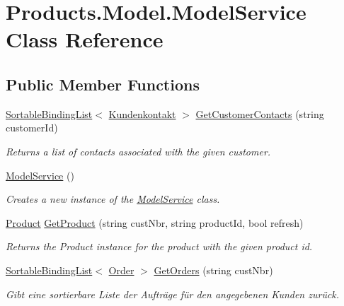 \hypertarget{class_products_1_1_model_1_1_model_service}{}\section{Products.\+Model.\+Model\+Service Class Reference}
\label{class_products_1_1_model_1_1_model_service}
\subsection*{Public Member Functions}
\begin{DoxyCompactItemize}
\item 
\hyperlink{class_products_1_1_common_1_1_sortable_binding_list}{Sortable\+Binding\+List}$<$ \hyperlink{class_products_1_1_model_1_1_entities_1_1_kundenkontakt}{Kundenkontakt} $>$ \hyperlink{class_products_1_1_model_1_1_model_service_af281c8ff9449031f251191502d0047f8}{Get\+Customer\+Contacts} (string customer\+Id)
\begin{DoxyCompactList}\small\item\em Returns a list of contacts associated with the given customer. \end{DoxyCompactList}\item 
\hyperlink{class_products_1_1_model_1_1_model_service_ad9cf5692491c9129e3bb003973f28fd1}{Model\+Service} ()
\begin{DoxyCompactList}\small\item\em Creates a new instance of the \hyperlink{class_products_1_1_model_1_1_model_service}{Model\+Service} class. \end{DoxyCompactList}\item 
\hyperlink{class_products_1_1_model_1_1_entities_1_1_product}{Product} \hyperlink{class_products_1_1_model_1_1_model_service_a5d2528c4e3669b6c49cb3e7c16307f49}{Get\+Product} (string cust\+Nbr, string product\+Id, bool refresh)
\begin{DoxyCompactList}\small\item\em Returns the Product instance for the product with the given product id. \end{DoxyCompactList}\item 
\hyperlink{class_products_1_1_common_1_1_sortable_binding_list}{Sortable\+Binding\+List}$<$ \hyperlink{class_products_1_1_model_1_1_entities_1_1_order}{Order} $>$ \hyperlink{class_products_1_1_model_1_1_model_service_ac24d4f576bf4b189abc38a60d36053d3}{Get\+Orders} (string cust\+Nbr)
\begin{DoxyCompactList}\small\item\em Gibt eine sortierbare Liste der Aufträge für den angegebenen Kunden zurück. \end{DoxyCompactList}\item 

\end{DoxyCompactItemize}

